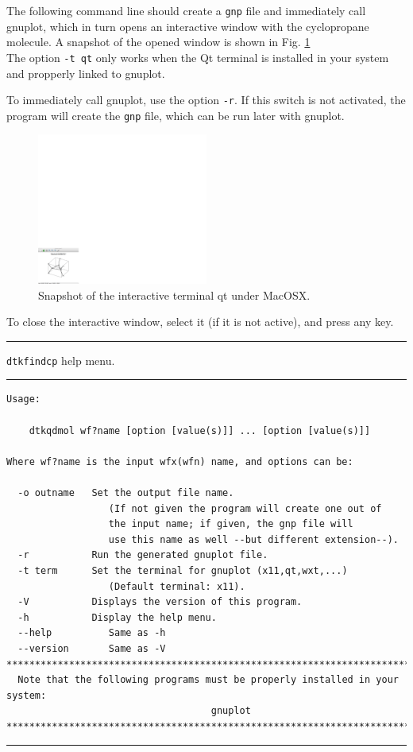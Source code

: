 The following command line should create a \texttt{gnp} file and immediately call gnuplot, which in turn opens an interactive window with the cyclopropane molecule. A snapshot of the opened window is shown in Fig. \ref{fig:dtkqdmolusex}\\
The option \texttt{-t qt} only works when the Qt terminal is installed in your system and propperly linked to gnuplot.

To immediately call gnuplot, use the option \texttt{-r}. If this switch is not activated, the program will create the \texttt{gnp} file, which can be run later with gnuplot.
%
\begin{figure}[hb!]
\centering
\includegraphics[width=0.5\textwidth]{dtkqdmolusex}
\caption{Snapshot of the interactive terminal qt under MacOSX.}\label{fig:dtkqdmolusex}
\end{figure}
%

To close the interactive window, select it (if it is not active), and press any key.

\rule{\textwidth}{1pt}
{\center\texttt{dtkfindcp} help menu.\\}
\rule{\textwidth}{1pt}
\begin{footnotesize}
\begin{verbatim}
Usage:

	dtkqdmol wf?name [option [value(s)]] ... [option [value(s)]]

Where wf?name is the input wfx(wfn) name, and options can be:

  -o outname   Set the output file name.
                  (If not given the program will create one out of
                  the input name; if given, the gnp file will
                  use this name as well --but different extension--).
  -r           Run the generated gnuplot file.
  -t term      Set the terminal for gnuplot (x11,qt,wxt,...)
                  (Default terminal: x11).
  -V           Displays the version of this program.
  -h           Display the help menu.
  --help          Same as -h
  --version       Same as -V
********************************************************************************
  Note that the following programs must be properly installed in your system:
                                    gnuplot
********************************************************************************
\end{verbatim}
\end{footnotesize}
\rule{\textwidth}{1pt}


